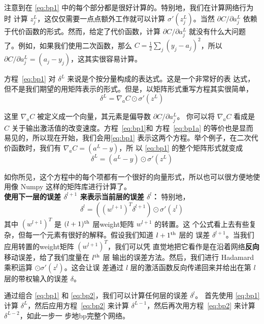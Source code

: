 注意到在 \eqref{eq:bp1} 中的每个部分都是很好计算的。特别地，我们在计算网络行为时
计算 $z_j^L$，这仅仅需要一点点额外工作就可以计算 $\sigma'(z_j^L)$。当然
$\partial C/\partial a_j^L$ 依赖于代价函数的形式。然而，给定了代价函数，计算
$\partial C/\partial a_j^L$ 就没有什么大问题了。例如，如果我们使用二次函数，那么
$C = \frac{1}{2} \sum_j(y_j-a_j)^2$，所以 $\partial C/\partial a_j^L = (a_j -
y_j)$，这其实很容易计算。

方程~\eqref{eq:bp1} 对 $\delta^L$ 来说是个按分量构成的表达式。这是一个非常好的表
达式，但不是我们期望的用矩阵表示的形式。但是，以矩阵形式重写方程其实很简单，
\begin{equation}
  \delta^L = \nabla_a C \odot \sigma'(z^L)
  \label{eq:bp1a}\tag{BP1a}
\end{equation}

这里 $\nabla_a C$ 被定义成一个向量，其元素是偏导数 $\partial C/\partial a_j^L$。
你可以将 $\nabla_a C$ 看成是 $C$ 关于输出激活值的改变速度。方程~\eqref{eq:bp1}和
方程~\eqref{eq:bp1a} 的等价也是显而易见的，所以现在开始，我们会用\eqref{eq:bp1}
表示这两个方程。举个例子，在二次代价函数时，我们有 $\nabla_a C = (a^L - y)$，所
以 \eqref{eq:bp1} 的整个矩阵形式就变成
\begin{equation}
  \delta^L = (a^L-y) \odot \sigma'(z^L)
  \label{eq:30}\tag{30}
\end{equation}

如你所见，这个方程中的每个项都有一个很好的向量形式，所以也可以很方便地使用像
Numpy 这样的矩阵库进行计算了。\\

\textbf{使用下一层的误差 $\delta^{l+1}$ 来表示当前层的误差 $\delta^l$：} 特别地，
\begin{equation}
  \delta^l = ((w^{l+1})^T \delta^{l+1}) \odot \sigma'(z^l)
  \label{eq:bp2}\tag{BP2}
\end{equation}
其中 $(w^{l+1})^T$ 是 $(l+1)^{\rm th}$ 层\gls*{weight}矩阵 $w^{l+1}$ 的转置。这
个公式看上去有些复杂，但每一个元素有很好的解释。假设我们知道 $l+1^{\rm th}$ 层的
误差 $\delta^{l+1}$。当我们应用转置的\gls*{weight}矩阵 $(w^{l+1})^T$，我们可以凭
直觉地把它看作是在沿着网络\textbf{反向}移动误差，给了我们度量在 $l^{\rm th}$ 层
输出的误差方法。然后，我们进行 Hadamard 乘积运算 $\odot \sigma'(z^l)$。这会让误
差通过 $l$ 层的激活函数反向传递回来并给出在第 $l$ 层的带权输入的误差 $\delta$。

通过组合 \eqref{eq:bp1} 和 \eqref{eq:bp2}，我们可以计算任何层的误差 $\delta^l$。
首先使用 \eqref{eq:bp1} 计算 $\delta^L$，然后应用方程~\eqref{eq:bp2} 来计算
$\delta^{L-1}$，然后再次用方程~\eqref{eq:bp2} 来计算 $\delta^{L-2}$，如此一步一
步地\gls*{bp}完整个网络。\\

